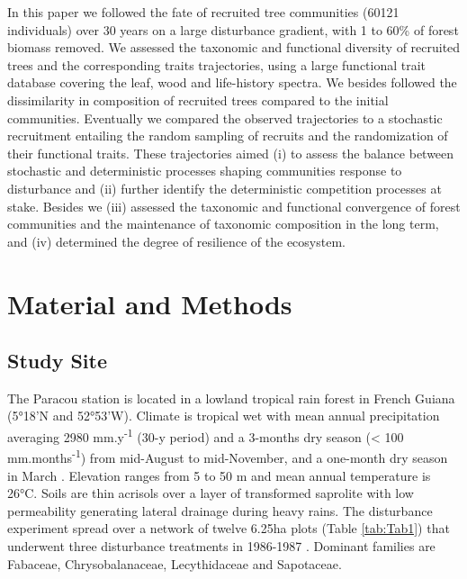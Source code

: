 \documentclass[fleqn,10pt]{ArtEcoFoG} %
\begin{document}
In this paper we followed the fate of recruited tree communities (60121
individuals) over 30 years on a large disturbance gradient, with 1 to
60\% of forest biomass removed. We assessed the taxonomic and functional
diversity of recruited trees and the corresponding traits trajectories,
using a large functional trait database covering the leaf, wood and
life-history spectra. We besides followed the dissimilarity in
composition of recruited trees compared to the initial communities.
Eventually we compared the observed trajectories to a stochastic
recruitment entailing the random sampling of recruits and the
randomization of their functional traits. These trajectories aimed (i)
to assess the balance between stochastic and deterministic processes
shaping communities response to disturbance and (ii) further identify
the deterministic competition processes at stake. Besides we (iii)
assessed the taxonomic and functional convergence of forest communities
and the maintenance of taxonomic composition in the long term, and (iv)
determined the degree of resilience of the ecosystem.

\section{Material and Methods}\label{material-and-methods}

\subsection{Study Site}\label{study-site}

The Paracou station is located in a lowland tropical rain forest in
French Guiana (5°18'N and 52°53'W). Climate is tropical wet with mean
annual precipitation averaging 2980 mm.y\textsuperscript{-1} (30-y
period) and a 3-months dry season (\textless{} 100
mm.months\textsuperscript{-1}) from mid-August to mid-November, and a
one-month dry season in March \citep{Wagner2011}. Elevation ranges from
5 to 50 m and mean annual temperature is 26°C. Soils are thin acrisols
over a layer of transformed saprolite with low permeability generating
lateral drainage during heavy rains. The disturbance experiment spread
over a network of twelve 6.25ha plots (Table \ref{tab:Tab1}) that
underwent three disturbance treatments in 1986-1987 \citep{Herault2018}.
Dominant families are Fabaceae, Chrysobalanaceae, Lecythidaceae and
Sapotaceae.
\end{document}
